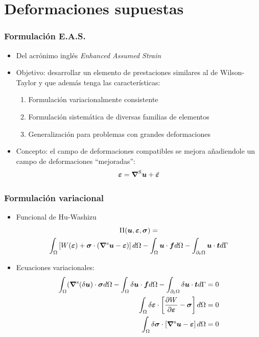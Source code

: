 \documentclass[handout]{beamer}
\begin{document}
\section{Deformaciones supuestas}
\begin{frame}
\frametitle{Formulación E.A.S.}
\begin{itemize}
\item Del acrónimo inglés {\em Enhanced Assumed Strain}
\item Objetivo: desarrollar un 
elemento de prestaciones similares al de
Wilson-Taylor y que además tenga las características:
\begin{enumerate}
\item Formulación variacionalmente consistente
\item Formulación sistemática de diversas familias de elementos
\item Generalización para problemas con grandes deformaciones
\end{enumerate}
\item Concepto: el campo de deformaciones compatibles se mejora 
añadiendole un campo de deformaciones ``mejoradas'':
$$\bm{\varepsilon}=\bm{\nabla}^{\rm S}\bm{u}+\tilde{\bm{\varepsilon}}$$
\end{itemize}
\end{frame}
\begin{frame}
\frametitle{Formulación variacional}
\begin{itemize}
\item Funcional de Hu-Washizu
\begin{multline*}
\Pi(\bm{u},\bm{\varepsilon},\bm{\sigma})= \\
\int_{\Omega} \left[
W(\bm{\varepsilon})+\bm{\sigma}\cdot(\bm{\nabla}^{\rm s} \bm{u}-\bm{\varepsilon})
\right] d\Omega
-\int_{\Omega} \bm{u} \cdot \bm{f} d \Omega-
\int_{\partial_{t} \Omega} \bm{u} \cdot \bm{t} d \Gamma
\end{multline*}
\item Ecuaciones variacionales:
\begin{align*}
\int_{\Omega} 
(\bm{\nabla}^{\rm s} (\delta \bm{u})\cdot \bm{\sigma} d \Omega
-\int_{\Omega} \delta \bm{u} \cdot \bm{f} d \Omega-
\int_{\partial_{t} \Omega} \delta \bm{u} \cdot \bm{t} d \Gamma&=0 \\
\int_{\Omega} 
\delta \bm{\varepsilon} \cdot  \left[
\frac{\partial W}{\partial \bm{\varepsilon}}-\bm{\sigma} \right]
d\Omega&=0 \\
\int_{\Omega} 
\delta \bm{\sigma}\cdot \left[\bm{\nabla}^{\rm s} \bm{u}-\bm{\varepsilon}\right]
d\Omega&= 0
\end{align*}
\end{itemize}
\end{frame}
\end{document}

